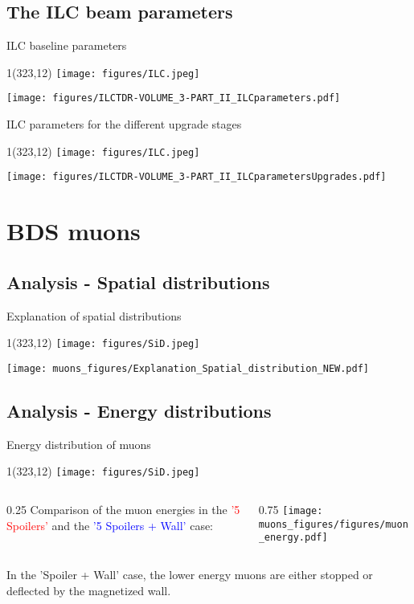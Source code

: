 \documentclass[xcolor={dvipsnames}]{beamer}
\newcommand{\sidlogo}{
  \setlength{\TPHorizModule}{1pt}
  \setlength{\TPVertModule}{1pt}
  \begin{textblock}{1}(323,12)
   \texttt{[image: figures/SiD.jpeg]}
  \end{textblock}
  }
\newcommand{\ilclogo}{
  \setlength{\TPHorizModule}{1pt}
  \setlength{\TPVertModule}{1pt}
  \begin{textblock}{1}(323,12)
   \texttt{[image: figures/ILC.jpeg]}
  \end{textblock}
}
\begin{document}
\subsection{The ILC beam parameters}
\begin{frame}{ILC baseline parameters}
\ilclogo
\begin{center}
	\texttt{[image: figures/ILCTDR-VOLUME\_3-PART\_II\_ILCparameters.pdf]}
\end{center}
\end{frame}
\begin{frame}{ILC parameters for the different upgrade stages}
\ilclogo
\begin{center}
	\texttt{[image: figures/ILCTDR-VOLUME\_3-PART\_II\_ILCparametersUpgrades.pdf]}
\end{center}
\end{frame}

\section{BDS muons}
\subsection{Analysis - Spatial distributions}
\begin{frame}{Explanation of spatial distributions}
\sidlogo
 \begin{center}
\texttt{[image: muons\_figures/Explanation\_Spatial\_distribution\_NEW.pdf]}
\end{center}
\end{frame}

\subsection{Analysis - Energy distributions}
\begin{frame}{Energy distribution of muons}
\sidlogo
\begin{columns}
 \begin{column}{0.25\textwidth}
 \small
  Comparison of the muon energies in the \textcolor{red}{'5 Spoilers'} and the \textcolor{blue}{'5 Spoilers + Wall'} case:
 \end{column}
 \begin{column}{0.75\textwidth}
  \texttt{[image: muons\_figures/figures/muon\_energy.pdf]}
 \end{column}
\end{columns}
In the 'Spoiler + Wall' case, the lower energy muons are either stopped or deflected by the magnetized wall.
\end{frame}
\end{document}
